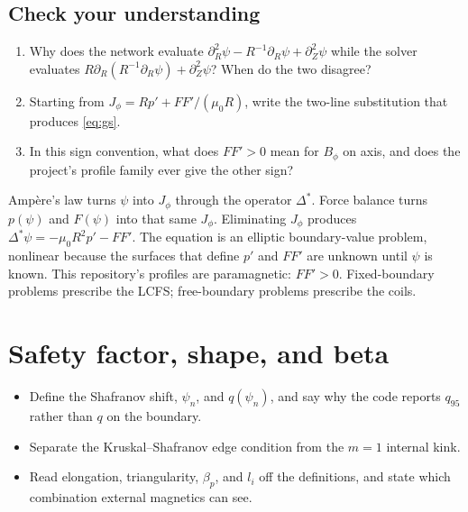 \documentclass[11pt,a4paper,oneside,openany]{book}
\numberwithin{equation}{chapter}
\newcommand{\Dstar}{\Delta^{*}}
\newcommand{\psin}{\psi_{n}}
\theoremstyle{definition}
\begin{document}
\section*{Check your understanding}
\begin{enumerate}[label=\textbf{Q5.\arabic*.},leftmargin=2.4em]
\item Why does the network evaluate \(\partial_{R}^{2}\psi-R^{-1}\partial_{R}\psi+\partial_{Z}^{2}\psi\) while the solver evaluates \(R\partial_{R}(R^{-1}\partial_{R}\psi)+\partial_{Z}^{2}\psi\)? When do the two disagree?
\item Starting from \(J_{\phi}=R p'+FF'/(\mu_{0} R)\), write the two-line substitution that produces \eqref{eq:gs}.
\item In this sign convention, what does \(FF'>0\) mean for \(B_{\phi}\) on axis, and does the project's profile family ever give the other sign?
\end{enumerate}

\begin{keyideas}
Amp\`ere's law turns \(\psi\) into \(J_{\phi}\) through the operator \(\Dstar\). Force balance turns \(p(\psi)\) and \(F(\psi)\) into that same \(J_{\phi}\). Eliminating \(J_{\phi}\) produces \(\Dstar\psi=-\mu_{0} R^{2} p'-FF'\). The equation is an elliptic boundary-value problem, nonlinear because the surfaces that define \(p'\) and \(FF'\) are unknown until \(\psi\) is known. This repository's profiles are paramagnetic: \(FF'>0\). Fixed-boundary problems prescribe the LCFS; free-boundary problems prescribe the coils.
\end{keyideas}


\chapter{Safety factor, shape, and beta}
\label{ch:quantities}

\begin{objectives}
\begin{itemize}[leftmargin=1.2em]
\item Define the Shafranov shift, \(\psin\), and \(q(\psin)\), and say why the code reports \(q_{95}\) rather than \(q\) on the boundary.
\item Separate the Kruskal--Shafranov edge condition from the \(m=1\) internal kink.
\item Read elongation, triangularity, \(\beta_{p}\), and \(l_{i}\) off the definitions, and state which combination external magnetics can see.
\end{itemize}
\end{objectives}
\end{document}
